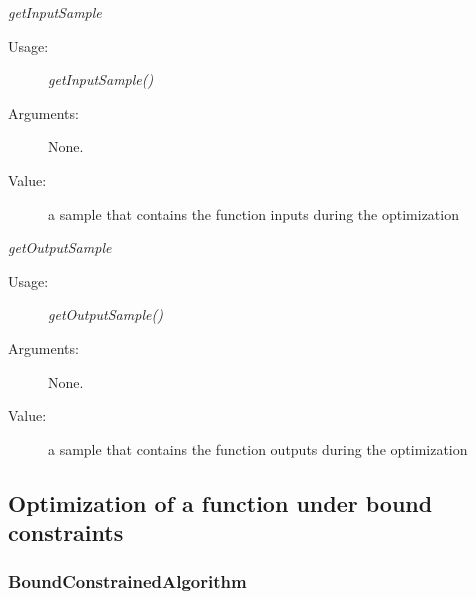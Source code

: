 \begin{description}
\begin{description}
  \item \textit{getInputSample}
    \begin{description}
    \item[Usage:] \textit{getInputSample()}
    \item[Arguments:] None.
    \item[Value:] a sample that contains the function inputs during the optimization
    \end{description}
    \bigskip

  \item \textit{getOutputSample}
    \begin{description}
    \item[Usage:] \textit{getOutputSample()}
    \item[Arguments:] None.
    \item[Value:] a sample that contains the function outputs during the optimization
    \end{description}

  \end{description}

\end{description}



\newpage
\subsection{Optimization of a function under bound constraints}

\subsubsection{BoundConstrainedAlgorithm}

